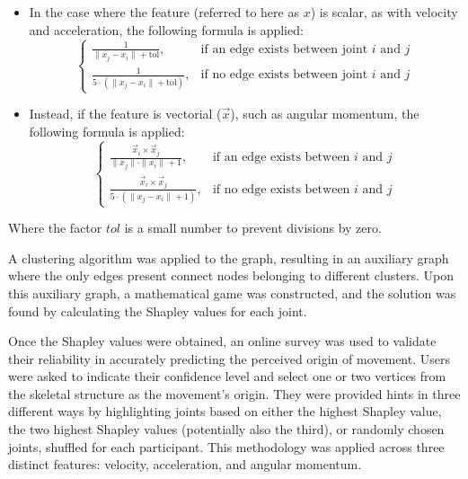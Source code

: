 \begin{itemize}
  \item In the case where the feature (referred to here as $x$) is scalar, as with velocity and acceleration, the following formula is applied:
  \begin{equation}
    \left\{
      \begin{array}{ll}
        \frac{1}{{\|x_{j} - x_{i}\| + \text{tol}}}, & \text{if an edge exists between joint } i \text{ and } j \\
        \frac{1}{{5 \cdot (\|x_{j} - x_{i}\| + \text{tol})}}, & \text{if no edge exists between joint } i \text{ and } j 
        \end{array}
      \right.
  \end{equation}
  \item Instead, if the feature is vectorial ($\vec{x}$), such as angular momentum, the following formula is applied:
  \begin{equation}
    \left\{
      \begin{array}{ll}
        \frac{\vec{x}_{i}\times\vec{x}_{j}}{{\|x_{j}\| \cdot \|x_{i}\|}+1}, & \text{if an edge exists between } i \text{ and } j \\
        \frac{\vec{x}_{i}\times\vec{x}_{j}}{{5 \cdot (\|x_{j} - x_{i}\| + 1)}}, & \text{if no edge exists between } i \text{ and } j 
        \end{array}
      \right.
  \end{equation}
\end{itemize}
Where the factor $tol$ is a small number to prevent divisions by zero.

A clustering algorithm was applied to the graph, resulting in an auxiliary graph where the only edges present connect nodes belonging to different clusters. Upon this auxiliary graph, a mathematical game was constructed, and the solution was found by calculating the Shapley values for each joint.

Once the Shapley values were obtained, an online survey was used to validate their reliability in accurately predicting the perceived origin of movement. Users were asked to indicate their confidence level and select one or two vertices from the skeletal structure as the movement's origin. They were provided hints in three different ways by highlighting joints based on either the highest Shapley value, the two highest Shapley values (potentially also the third), or randomly chosen joints, shuffled for each participant. This methodology was applied across three distinct features: velocity, acceleration, and angular momentum.

